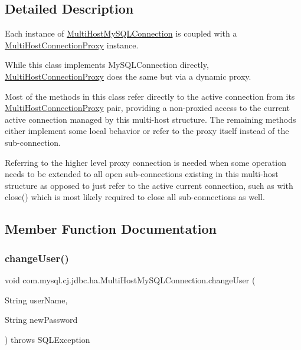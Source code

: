 \subsection{Detailed Description}
Each instance of \mbox{\hyperlink{classcom_1_1mysql_1_1cj_1_1jdbc_1_1ha_1_1_multi_host_my_s_q_l_connection}{Multi\+Host\+My\+S\+Q\+L\+Connection}} is coupled with a \mbox{\hyperlink{classcom_1_1mysql_1_1cj_1_1jdbc_1_1ha_1_1_multi_host_connection_proxy}{Multi\+Host\+Connection\+Proxy}} instance.

While this class implements My\+S\+Q\+L\+Connection directly, \mbox{\hyperlink{classcom_1_1mysql_1_1cj_1_1jdbc_1_1ha_1_1_multi_host_connection_proxy}{Multi\+Host\+Connection\+Proxy}} does the same but via a dynamic proxy.

Most of the methods in this class refer directly to the active connection from its \mbox{\hyperlink{classcom_1_1mysql_1_1cj_1_1jdbc_1_1ha_1_1_multi_host_connection_proxy}{Multi\+Host\+Connection\+Proxy}} pair, providing a non-\/proxied access to the current active connection managed by this multi-\/host structure. The remaining methods either implement some local behavior or refer to the proxy itself instead of the sub-\/connection.

Referring to the higher level proxy connection is needed when some operation needs to be extended to all open sub-\/connections existing in this multi-\/host structure as opposed to just refer to the active current connection, such as with close() which is most likely required to close all sub-\/connections as well. 

\subsection{Member Function Documentation}
\mbox{\label{classcom_1_1mysql_1_1cj_1_1jdbc_1_1ha_1_1_multi_host_my_s_q_l_connection_a12c407fe2d10ba1f27cae220289f8adf}} 
\subsubsection{\texorpdfstring{change\+User()}{changeUser()}}
{\footnotesize\ttfamily void com.\+mysql.\+cj.\+jdbc.\+ha.\+Multi\+Host\+My\+S\+Q\+L\+Connection.\+change\+User (\begin{DoxyParamCaption}\item[{String}]{user\+Name,  }\item[{String}]{new\+Password }\end{DoxyParamCaption}) throws S\+Q\+L\+Exception}

